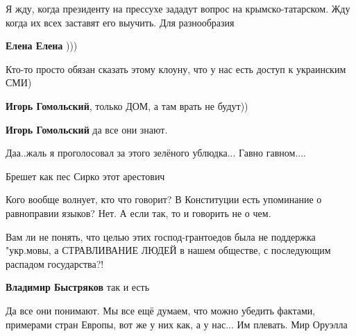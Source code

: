 \begin{itemize}

Я жду, когда президенту на прессухе зададут вопрос на крымско-татарском. Жду
когда их всех заставят его выучить. Для разнообразия

\begin{itemize} %
\textbf{Елена Елена} )))
\end{itemize} %

Кто-то просто обязан сказать этому клоуну, что у нас есть доступ к украинским СМИ)

\begin{itemize} %
\textbf{Игорь Гомольский}, только ДОМ, а там врать не будут))

\textbf{Игорь Гомольский} да все они знают.
\end{itemize} %

Даа..жаль я проголосовал за этого зелёного ублюдка... Гавно гавном....

Брешет как пес Сирко этот арестович

Кого вообще волнует, кто что говорит? В Конституции есть упоминание о равноправии языков? Нет. А если так, то и говорить не о чем.


Вам ли не понять, что целью этих господ-грантоедов была не поддержка "укр.мовы,
а СТРАВЛИВАНИЕ ЛЮДЕЙ в нашем обществе, с последующим распадом государства?!

\begin{itemize} %
\textbf{Владимир Быстряков} так и есть
\end{itemize} %


Да все они понимают. Мы все ещё думаем, что можно убедить фактами, примерами
стран Европы, вот же у них как, а у нас... Им плевать. Мир Оруэлла

\end{itemize} %

